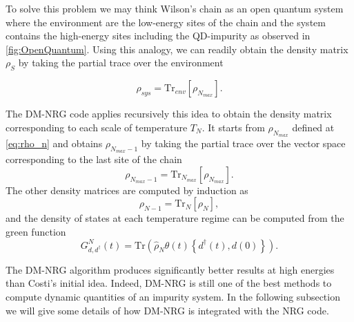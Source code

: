 To solve this problem we may think Wilson's chain as an open quantum system where the environment are the low-energy sites of the chain and the system  contains the high-energy sites including the QD-impurity  as observed in \ref{fig:OpenQuantum}. Using this analogy,  we can readily obtain the density matrix $\rho_S$ by taking the partial trace over the environment

\begin{equation}
\rho_{sys} = \text{Tr}_{env}[\rho_{N_{max}}].
\end{equation} 

The DM-NRG code applies recursively this idea to obtain the density matrix corresponding to each scale of temperature $T_N$. It starts from $\rho_{N_{max}}$ defined at \eqref{eq:rho_n} and obtains $\rho_{N_{max}-1} $ by taking the partial trace over the vector space corresponding to the last site of the chain
\begin{equation}
\rho_{N_{max}-1} = \text{Tr}_{N_{max}}[\rho_{N_{max}}].
\end{equation}
\noindent The other density matrices are computed by induction as 
\begin{equation}
\rho_{N-1} = \text{Tr}_{N}[\rho_{N}],
\end{equation}
and the density of states at each temperature regime can be computed from the green function 
\begin{equation}
G_{d,d^{\dagger}}^{N} (t) = \text{Tr} \left( \hat{\rho}_{N}\theta(t)\left\{ d^{\dagger}(t),d(0)\right\} \right). 
\end{equation}

The DM-NRG algorithm produces significantly better results  at high energies than Costi's initial idea. Indeed, DM-NRG is still one of the best methods to compute dynamic quantities of an impurity system. In the following subsection we will give some details of how DM-NRG is integrated with the NRG code. 








